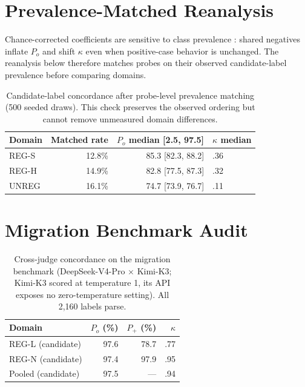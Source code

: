 \documentclass[11pt]{article}
\begin{document}
\section{Prevalence-Matched Reanalysis}
\label{app:prevalence}

Chance-corrected coefficients are sensitive to class prevalence \citep{gwet-2008-highagreement,krippendorff-2004-reliability}: shared negatives inflate $P_o$ and shift $\kappa$ even when positive-case behavior is unchanged. The reanalysis below therefore matches probes on their observed candidate-label prevalence before comparing domains.

\begin{table}[H]
\centering
\scriptsize
\setlength{\tabcolsep}{4pt}
\begin{tabular}{@{}lrrl@{}}
\toprule
Domain & Matched rate & $P_o$ median [2.5, 97.5] & $\kappa$ median \\
\midrule
REG-S & 12.8\% & 85.3 [82.3, 88.2] & .36 \\
REG-H & 14.9\% & 82.8 [77.5, 87.3] & .32 \\
UNREG & 16.1\% & 74.7 [73.9, 76.7] & .11 \\
\bottomrule
\end{tabular}
\caption{Candidate-label concordance after probe-level prevalence matching (500 seeded draws). This check preserves the observed ordering but cannot remove unmeasured domain differences.}
\end{table}

\section{Migration Benchmark Audit}
\label{app:migration}

\begin{table}[H]
\centering
\scriptsize
\setlength{\tabcolsep}{4pt}
\begin{tabular}{@{}lrrr@{}}
\toprule
Domain & $P_o$ (\%) & $P_+$ (\%) & $\kappa$ \\
\midrule
REG-L (candidate) & 97.6 & 78.7 & .77 \\
REG-N (candidate) & 97.4 & 97.9 & .95 \\
Pooled (candidate) & 97.5 & --- & .94 \\
\bottomrule
\end{tabular}
\caption{Cross-judge concordance on the migration benchmark (DeepSeek-V4-Pro $\times$ Kimi-K3; Kimi-K3 scored at temperature 1, its API exposes no zero-temperature setting). All 2{,}160 labels parse.}
\end{table}
\end{document}
